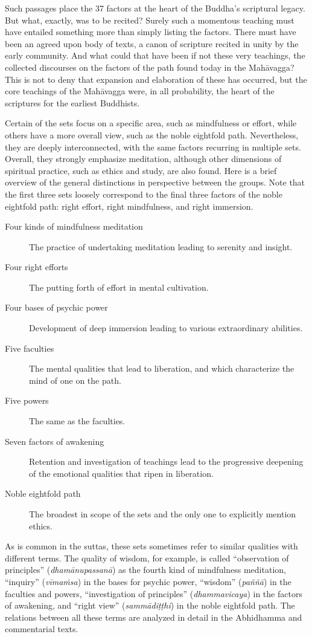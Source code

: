 \documentclass[12pt,openany]{book}%
\begin{document}
Such passages place the 37 factors at the heart of the Buddha’s scriptural legacy. But what, exactly, was to be recited? Surely such a momentous teaching must have entailed something more than simply listing the factors. There must have been an agreed upon body of texts, a canon of scripture recited in unity by the early community. And what could that have been if not these very teachings, the collected discourses on the factors of the path found today in the \textsanskrit{Mahāvagga}? This is not to deny that expansion and elaboration of these has occurred, but the core teachings of the \textsanskrit{Mahāvagga} were, in all probability, the heart of the scriptures for the earliest Buddhists.

Certain of the sets focus on a specific area, such as mindfulness or effort, while others have a more overall view, such as the noble eightfold path. Nevertheless, they are deeply interconnected, with the same factors recurring in multiple sets. Overall, they strongly emphasize meditation, although other dimensions of spiritual practice, such as ethics and study, are also found. Here is a brief overview of the general distinctions in perspective between the groups. Note that the first three sets loosely correspond to the final three factors of the noble eightfold path: right effort, right mindfulness, and right immersion.

\begin{description}%
\item[Four kinds of mindfulness meditation] The practice of undertaking meditation leading to serenity and insight.%
\item[Four right efforts] The putting forth of effort in mental cultivation.%
\item[Four bases of psychic power] Development of deep immersion leading to various extraordinary abilities.%
\item[Five faculties] The mental qualities that lead to liberation, and which characterize the mind of one on the path.%
\item[Five powers] The same as the faculties.%
\item[Seven factors of awakening] Retention and investigation of teachings lead to the progressive deepening of the emotional qualities that ripen in liberation.%
\item[Noble eightfold path] The broadest in scope of the sets and the only one to explicitly mention ethics.%
\end{description}

As is common in the suttas, these sets sometimes refer to similar qualities with different terms. The quality of wisdom, for example, is called “observation of principles” (\textit{\textsanskrit{dhamānupassanā}}) as the fourth kind of mindfulness meditation, “inquiry” (\textit{\textsanskrit{vīmaṁsa}}) in the bases for psychic power, “wisdom” (\textit{\textsanskrit{paññā}}) in the faculties and powers, “investigation of principles” (\textit{dhammavicaya}) in the factors of awakening, and “right view” (\textit{\textsanskrit{sammādiṭṭhi}}) in the noble eightfold path. The relations between all these terms are analyzed in detail in the Abhidhamma and commentarial texts.
\end{document}
